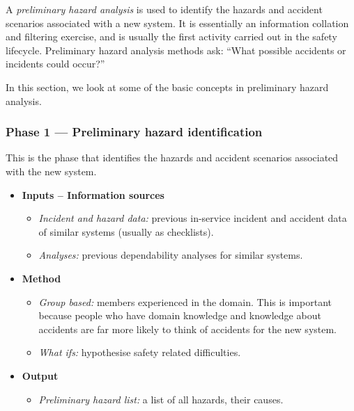  A \emph{preliminary hazard analysis} is used to identify the hazards and accident scenarios associated with a new system. It is essentially an information collation and filtering exercise, and is usually the
first activity carried out in the safety lifecycle. Preliminary hazard analysis methods ask: ``What
possible accidents or incidents could occur?''

In this section, we look at some of the basic concepts in preliminary hazard analysis.


  \subsubsection*{Phase 1 --- Preliminary hazard identification}

   This is the phase that identifies the hazards and accident scenarios 
    	associated with the new system. 


  \begin{itemize}
    \item \textbf{Inputs -- Information sources}
     
        \begin{itemize}

            \item \emph{Incident and hazard data:} previous in-service 
            incident and accident data of similar systems (usually as 
            checklists).
             
            \item \emph{Analyses:} previous dependability analyses for 
            similar systems.
             
        \end{itemize}
         
    \item \textbf{Method}
    
        \begin{itemize}
        
            \item \emph{Group based:} members experienced in the domain. This is important because people who have domain knowledge and knowledge about accidents are far more likely to think of accidents for the new system.
            
            \item \emph{What ifs:} hypothesise safety related 
            difficulties.
        
        \end{itemize}
        
    \item \textbf{Output}
    
        \begin{itemize}

            \item \emph{Preliminary hazard list:} a list of all hazards, their causes.
        
        \end{itemize}

\end{itemize}

